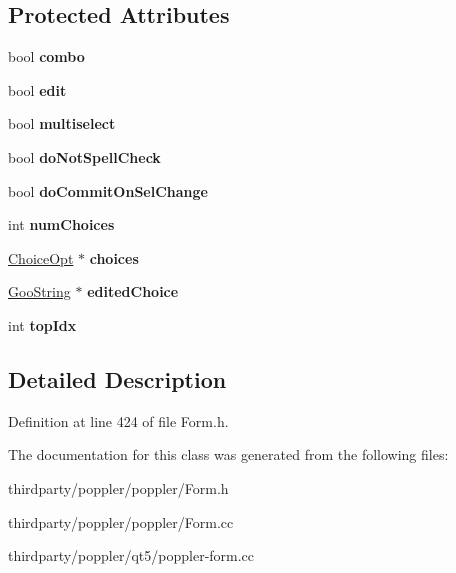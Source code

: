\subsection*{Protected Attributes}
\begin{DoxyCompactItemize}
\item 
\mbox{\label{class_form_field_choice_a7358e95d5e63cab13d8f08163331f551}} 
bool {\bfseries combo}
\item 
\mbox{\label{class_form_field_choice_ac3ad6c13013dd562c8b2177802ee379a}} 
bool {\bfseries edit}
\item 
\mbox{\label{class_form_field_choice_aff46290a293c6b92709baf7391752379}} 
bool {\bfseries multiselect}
\item 
\mbox{\label{class_form_field_choice_ae8ff5a4bd8507c603cb10d0dd614564b}} 
bool {\bfseries do\+Not\+Spell\+Check}
\item 
\mbox{\label{class_form_field_choice_a915ee98c212054077ffe8470aa2a5e60}} 
bool {\bfseries do\+Commit\+On\+Sel\+Change}
\item 
\mbox{\label{class_form_field_choice_a9bfd8923ba0fe9fa243b28f4c235bffd}} 
int {\bfseries num\+Choices}
\item 
\mbox{\label{class_form_field_choice_a0a789ff0d95bb641da9cd208150015f5}} 
\hyperlink{struct_form_field_choice_1_1_choice_opt}{Choice\+Opt} $\ast$ {\bfseries choices}
\item 
\mbox{\label{class_form_field_choice_a0f871a92d4ad87af3b032ebf88935894}} 
\hyperlink{class_goo_string}{Goo\+String} $\ast$ {\bfseries edited\+Choice}
\item 
\mbox{\label{class_form_field_choice_a70448e620626576a91401163da527e7c}} 
int {\bfseries top\+Idx}
\end{DoxyCompactItemize}


\subsection{Detailed Description}


Definition at line 424 of file Form.\+h.



The documentation for this class was generated from the following files\+:\begin{DoxyCompactItemize}
\item 
thirdparty/poppler/poppler/Form.\+h\item 
thirdparty/poppler/poppler/Form.\+cc\item 
thirdparty/poppler/qt5/poppler-\/form.\+cc\end{DoxyCompactItemize}
